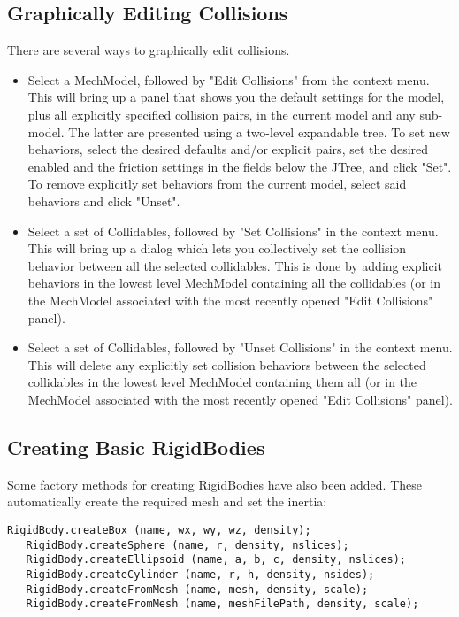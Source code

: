 \documentclass{article}
\begin{document}
\subsection*{Graphically Editing Collisions}

There are several ways to graphically edit collisions.

\begin{itemize}

\item Select a MechModel, followed by {\sf "Edit Collisions"} from the context 
menu. This will bring up a panel that shows you the default settings 
for the model, plus all explicitly specified collision pairs, in the 
current model and any sub-model. The latter are presented using a
 two-level expandable tree. To set new behaviors, select the desired 
defaults and/or explicit pairs, set the desired enabled and the
friction settings in the fields below the JTree, and click {\sf "Set"}. 
To remove explicitly set behaviors from the current model, select said 
behaviors and click {\sf "Unset"}.

\item Select a set of Collidables, followed by {\sf "Set Collisions"} in the 
context menu. This will bring up a dialog which lets you collectively 
set the collision behavior between all the selected collidables. This 
is done by adding explicit behaviors in the lowest level MechModel 
containing all the collidables (or in the MechModel associated with
the most recently opened {\sf "Edit Collisions"} panel).

\item Select a set of Collidables, followed by {\sf "Unset Collisions"} in the 
context menu. This will delete any explicitly set collision behaviors 
between the selected collidables in the lowest level MechModel
containing them all (or in the MechModel associated with the most 
recently opened {\sf "Edit Collisions"} panel). 

\end{itemize}

\subsection*{Creating Basic RigidBodies}

Some factory methods for creating RigidBodies have also been added. 
These automatically create the required mesh and set the inertia:

\begin{lstlisting}[]
   RigidBody.createBox (name, wx, wy, wz, density);
   RigidBody.createSphere (name, r, density, nslices);
   RigidBody.createEllipsoid (name, a, b, c, density, nslices);
   RigidBody.createCylinder (name, r, h, density, nsides);
   RigidBody.createFromMesh (name, mesh, density, scale);
   RigidBody.createFromMesh (name, meshFilePath, density, scale);
\end{lstlisting}
\end{document}
